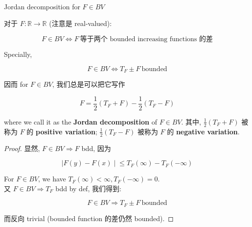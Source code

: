 \documentclass{qlnotes-export}
\begin{document}
\begin{theorem}{Jordan decomposition for \(F \in BV\)}\label{thm-12-differentiation-on-real-spaces-jordan-decomposition-for-f-in-bv}

对于 \(F:{\mathbb{R}}\rightarrow{\mathbb{R}}\) (注意是 real-valued):

\[F \in BV\Leftrightarrow F\ \text{等于两个 bounded increasing functions 的差}\]

Specially,

\[F \in BV\Leftrightarrow T_{F} \pm F\ \text{bounded}\]

因而 for \(F \in BV\), 我们总是可以把它写作

\[F = \frac{1}{2}(T_{F} + F) - \frac{1}{2}(T_{F} - F)\]

where we call it as the \textbf{Jordan decomposition} of \(F \in BV\). 其中, \(\frac{1}{2}(T_{F} + F)\) 被称为 \(F\) 的 \textbf{positive variation}; \(\frac{1}{2}(T_{F} - F)\) 被称为 \(F\) 的 \textbf{negative variation}.

\end{theorem}

\begin{proof}

显然, \(F \in BV\Longrightarrow F\) bdd, 因为

\[\left. |F(y) - F(x) \middle| \leq T_{F}(\infty) - T_{F}( - \infty) \right.\]

For \(F \in BV\), we have \(T_{F}(\infty) < \infty, T_{F}( - \infty) = 0\).\\
又 \(F \in BV\Longrightarrow T_{F}\) bdd by def, 我们得到:

\[F \in BV\Longrightarrow T_{F} \pm F\ \text{bounded}\]

而反向 trivial (bounded function 的差仍然 bounded).

\end{proof}
\end{document}
